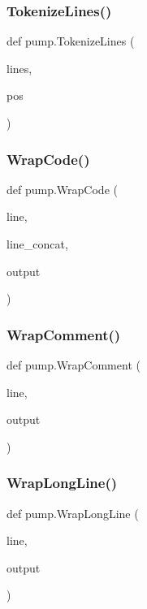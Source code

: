 \subsubsection{\texorpdfstring{Tokenize\+Lines()}{TokenizeLines()}}
{\footnotesize\ttfamily def pump.\+Tokenize\+Lines (\begin{DoxyParamCaption}\item[{}]{lines,  }\item[{}]{pos }\end{DoxyParamCaption})}

\mbox{\label{namespacepump_a42502545a37fcd4513a0a7ac8ef3c0eb}} 
\subsubsection{\texorpdfstring{Wrap\+Code()}{WrapCode()}}
{\footnotesize\ttfamily def pump.\+Wrap\+Code (\begin{DoxyParamCaption}\item[{}]{line,  }\item[{}]{line\+\_\+concat,  }\item[{}]{output }\end{DoxyParamCaption})}

\mbox{\label{namespacepump_a73951c98652038351b1cd24291433e12}} 
\subsubsection{\texorpdfstring{Wrap\+Comment()}{WrapComment()}}
{\footnotesize\ttfamily def pump.\+Wrap\+Comment (\begin{DoxyParamCaption}\item[{}]{line,  }\item[{}]{output }\end{DoxyParamCaption})}

\mbox{\label{namespacepump_a02427e2ddc80f0f408e27dfc3e38e702}} 
\subsubsection{\texorpdfstring{Wrap\+Long\+Line()}{WrapLongLine()}}
{\footnotesize\ttfamily def pump.\+Wrap\+Long\+Line (\begin{DoxyParamCaption}\item[{}]{line,  }\item[{}]{output }\end{DoxyParamCaption})}

